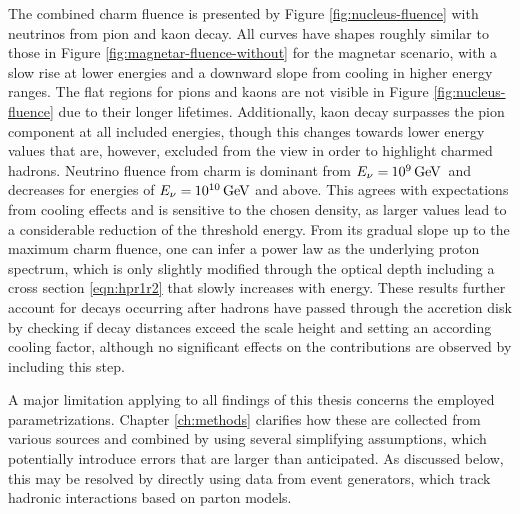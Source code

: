 The combined charm fluence is presented by Figure \ref{fig:nucleus-fluence} with neutrinos from pion and kaon decay. All curves have
shapes roughly similar to those in Figure \ref{fig:magnetar-fluence-without} for the magnetar scenario, with a slow rise at lower
energies and a downward slope from cooling in higher energy ranges. The flat regions for pions and kaons are not visible in Figure
\ref{fig:nucleus-fluence} due to their longer lifetimes. Additionally, kaon decay surpasses the pion component at all included energies,
though this changes towards lower energy values that are, however, excluded from the view in order to highlight charmed hadrons. Neutrino
fluence from charm is dominant from $E_\nu = \kern-0.5pt \qty{e9}{\giga\electronvolt}$~and decreases for energies of
$E_\nu = \kern-0.5pt \qty{e10}{\giga\electronvolt}$ and above. This agrees with expectations from cooling effects and is sensitive
to the chosen density, as larger values lead to a considerable reduction of the threshold energy. From its gradual slope up to the
maximum charm fluence, one can infer a power law as the underlying proton spectrum, which is only slightly modified through the optical
depth including a cross section \eqref{eqn:hpr1r2} that slowly increases with energy. These results further account for decays occurring
after hadrons have passed through the accretion disk by checking if decay distances exceed the scale height and setting an according
cooling factor, although no significant effects on the contributions are observed by including this step.

A major limitation applying to all findings of this thesis concerns the employed parametrizations. Chapter \ref{ch:methods}
clarifies how these are collected from various sources and combined by using several simplifying assumptions, which potentially
introduce errors that are larger than anticipated. As discussed below, this may be resolved by directly using data from event
generators, which track hadronic interactions based on parton models.

\enlargethispage*{\baselineskip}\newpage\null\vfill

\vfill\null\newpage\null\vfill

\vfill\null\newpage
